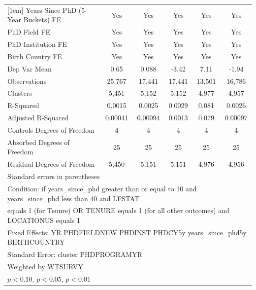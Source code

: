 \begin{table}[htbp]
\begin{tabular}{l*{5}{c}}
[1em]
Years Since PhD (5-Year Buckets) FE&         Yes         &         Yes         &         Yes         &         Yes         &         Yes         \\
[1em]
PhD Field FE&         Yes         &         Yes         &         Yes         &         Yes         &         Yes         \\
[1em]
PhD Institution FE&         Yes         &         Yes         &         Yes         &         Yes         &         Yes         \\
[1em]
Birth Country FE&         Yes         &         Yes         &         Yes         &         Yes         &         Yes         \\
\hline
Dep Var Mean&        0.65         &       0.088         &       -3.42         &        7.11         &       -1.94         \\
Observations&      25,767         &      17,441         &      17,441         &      13,501         &      16,786         \\
Clusters&       5,451         &       5,152         &       5,152         &       4,977         &       4,957         \\
R-Squared&      0.0015         &      0.0025         &      0.0029         &       0.081         &      0.0026         \\
Adjusted R-Squared&     0.00041         &     0.00094         &      0.0013         &       0.079         &     0.00097         \\
Controls Degrees of Freedom&           4         &           4         &           4         &           4         &           4         \\
Absorbed Degrees of Freedom&          25         &          25         &          25         &          25         &          25         \\
Residual Degrees of Freedom&       5,450         &       5,151         &       5,151         &       4,976         &       4,956         \\
\hline\hline
\multicolumn{6}{l}{\footnotesize Standard errors in parentheses}\\
\multicolumn{6}{l}{\footnotesize Condition: if years\_since\_phd greater than or equal to 10 and years\_since\_phd less than 40 and LFSTAT}\\
\multicolumn{6}{l}{\footnotesize equals 1 (for Tenure) OR TENURE equals 1 (for all other outcomes) and LOCATIONUS equals 1}\\
\multicolumn{6}{l}{\footnotesize Fixed Effects: YR PHDFIELDNEW PHDINST PHDCY5y years\_since\_phd5y BIRTHCOUNTRY}\\
\multicolumn{6}{l}{\footnotesize Standard Error: cluster PHDPROGRAMYR}\\
\multicolumn{6}{l}{\footnotesize Weighted by WTSURVY.}\\
\multicolumn{6}{l}{\footnotesize \sym{*} \(p<0.10\), \sym{**} \(p<0.05\), \sym{***} \(p<0.01\)}\\
\end{tabular}
\end{table}

